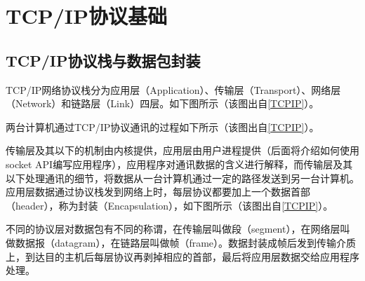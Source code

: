

\chapter{TCP/IP协议基础}
%





\section{TCP/IP协议栈与数据包封装}
%
TCP/\BookSplit{}IP网络协议栈分为应用层（Application）、传输层（Transport）、网络层（Network）和链路层（Link）四层。如下图所示（该图出自\hyperlink{db.bi01.bibli.tcpip}{[TCPIP]}）。








两台计算机通过TCP/\BookSplit{}IP协议通讯的过程如下所示（该图出自\hyperlink{db.bi01.bibli.tcpip}{[TCPIP]}）。




传输层及其以下的机制由内核提供，应用层由用户进程提供（后面将介绍如何使用socket API编写应用程序），应用程序对通讯数据的含义进行解释，而传输层及其以下处理通讯的细节，将数据从一台计算机通过一定的路径发送到另一台计算机。应用层数据通过协议栈发到网络上时，每层协议都要加上一个数据首部（header），称为封装（Encapsulation），如下图所示（该图出自\hyperlink{db.bi01.bibli.tcpip}{[TCPIP]}）。




不同的协议层对数据包有不同的称谓，在传输层叫做段（segment），在网络层叫做数据报（datagram），在链路层叫做帧（frame）。数据封装成帧后发到传输介质上，到达目的主机后每层协议再剥掉相应的首部，最后将应用层数据交给应用程序处理。



